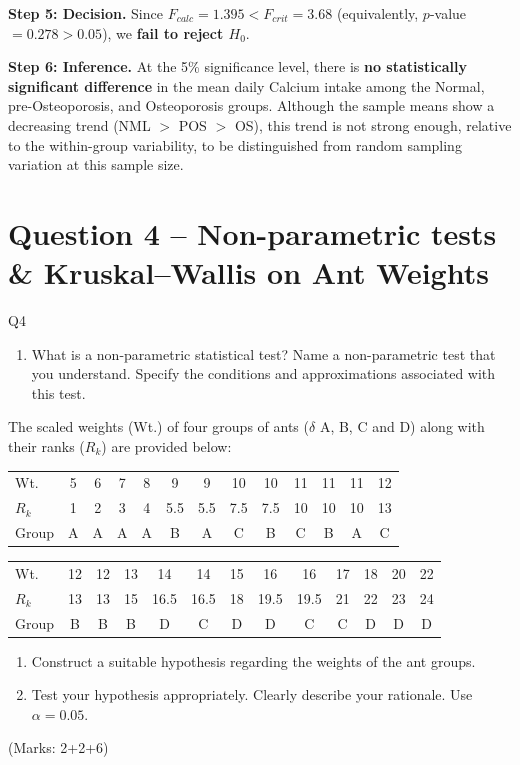 \documentclass[11pt]{article}
\begin{document}
\textbf{Step 5: Decision.} Since $F_{calc} = 1.395 < F_{crit} = 3.68$ (equivalently, $p$-value $= 0.278 > 0.05$), we \textbf{fail to reject $H_0$}.

\textbf{Step 6: Inference.} At the 5\% significance level, there is \textbf{no statistically significant difference} in the mean daily Calcium intake among the Normal, pre-Osteoporosis, and Osteoporosis groups. Although the sample means show a decreasing trend (NML $>$ POS $>$ OS), this trend is not strong enough, relative to the within-group variability, to be distinguished from random sampling variation at this sample size.

\section{Question 4 -- Non-parametric tests \& Kruskal--Wallis on Ant Weights}
\begin{question}{Q4}
\begin{enumerate}[label=(\alph*)]
\item What is a non-parametric statistical test? Name a non-parametric test that you understand. Specify the conditions and approximations associated with this test.
\end{enumerate}

The scaled weights (Wt.) of four groups of ants ($\delta$ A, B, C and D) along with their ranks ($R_k$) are provided below:

\begin{center}
\small
\begin{tabular}{l|cccccccccccc}
\toprule
Wt. & 5 & 6 & 7 & 8 & 9 & 9 & 10 & 10 & 11 & 11 & 11 & 12 \\
$R_k$ & 1 & 2 & 3 & 4 & 5.5 & 5.5 & 7.5 & 7.5 & 10 & 10 & 10 & 13 \\
Group & A & A & A & A & B & A & C & B & C & B & A & C \\
\bottomrule
\end{tabular}

\vspace{0.5em}
\begin{tabular}{l|cccccccccccc}
\toprule
Wt. & 12 & 12 & 13 & 14 & 14 & 15 & 16 & 16 & 17 & 18 & 20 & 22 \\
$R_k$ & 13 & 13 & 15 & 16.5 & 16.5 & 18 & 19.5 & 19.5 & 21 & 22 & 23 & 24 \\
Group & B & B & B & D & C & D & D & C & C & D & D & D \\
\bottomrule
\end{tabular}
\end{center}

\begin{enumerate}[resume,label=(\alph*)]
\item Construct a suitable hypothesis regarding the weights of the ant groups.
\item Test your hypothesis appropriately. Clearly describe your rationale. Use $\alpha=0.05$.
\end{enumerate}
(Marks: 2+2+6)
\end{question}
\end{document}

